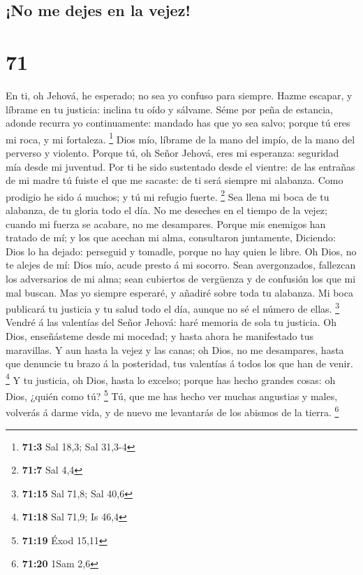 \hypertarget{no-me-dejes-en-la-vejez}{%
\subsection{¡No me dejes en la vejez!}\label{no-me-dejes-en-la-vejez}}

\hypertarget{section-70}{%
\section{71}\label{section-70}}

 En ti, oh Jehová, he esperado; no sea yo confuso para
siempre.  Hazme escapar, y líbrame en tu justicia: inclina
tu oído y sálvame.  Séme por peña de estancia, adonde
recurra yo continuamente: mandado has que yo sea salvo; porque tú eres
mi roca, y mi fortaleza. \footnote{\textbf{71:3} Sal 18,3; Sal 31,3-4}
 Dios mío, líbrame de la mano del impío, de la mano del
perverso y violento.  Porque tú, oh Señor Jehová, eres mi
esperanza: seguridad mía desde mi juventud.  Por ti he sido
sustentado desde el vientre: de las entrañas de mi madre tú fuiste el
que me sacaste: de ti será siempre mi alabanza.  Como
prodigio he sido á muchos; y tú mi refugio fuerte. \footnote{\textbf{71:7}
  Sal 4,4}  Sea llena mi boca de tu alabanza, de tu gloria
todo el día.  No me deseches en el tiempo de la vejez;
cuando mi fuerza se acabare, no me desampares.  Porque mis
enemigos han tratado de mí; y los que acechan mi alma, consultaron
juntamente,  Diciendo: Dios lo ha dejado: perseguid y
tomadle, porque no hay quien le libre.  Oh Dios, no te
alejes de mí: Dios mío, acude presto á mi socorro.  Sean
avergonzados, fallezcan los adversarios de mi alma; sean cubiertos de
vergüenza y de confusión los que mi mal buscan.  Mas yo
siempre esperaré, y añadiré sobre toda tu alabanza.  Mi
boca publicará tu justicia y tu salud todo el día, aunque no sé el
número de ellas. \footnote{\textbf{71:15} Sal 71,8; Sal 40,6}
 Vendré á las valentías del Señor Jehová: haré memoria de
sola tu justicia.  Oh Dios, enseñásteme desde mi mocedad; y
hasta ahora he manifestado tus maravillas.  Y aun hasta la
vejez y las canas; oh Dios, no me desampares, hasta que denuncie tu
brazo á la posteridad, tus valentías á todos los que han de venir.
\footnote{\textbf{71:18} Sal 71,9; Is 46,4}  Y tu justicia,
oh Dios, hasta lo excelso; porque has hecho grandes cosas: oh Dios,
¿quién como tú? \footnote{\textbf{71:19} Éxod 15,11}  Tú,
que me has hecho ver muchas angustias y males, volverás á darme vida, y
de nuevo me levantarás de los abismos de la tierra. \footnote{\textbf{71:20}
  1Sam 2,6}

